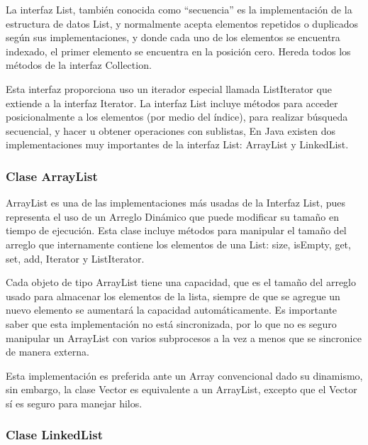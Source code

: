 \documentclass[11pt]{article}
\begin{document}
La interfaz List, también conocida como “secuencia” es la 
implementación de la estructura de datos List, y normalmente acepta 
elementos repetidos o duplicados según sus implementaciones, y donde 
cada uno de los elementos se encuentra indexado, el primer elemento 
se encuentra en la posición cero. Hereda todos los métodos de la 
interfaz Collection.

\par

Esta interfaz proporciona uso un iterador especial llamada 
ListIterator que extiende a la interfaz Iterator. La interfaz List 
incluye métodos para acceder posicionalmente a los elementos (por 
medio del índice), para realizar búsqueda secuencial, y hacer u 
obtener operaciones con sublistas, En Java existen dos 
implementaciones muy importantes de la interfaz List: ArrayList y 
LinkedList. 

\subsubsection{Clase ArrayList}
\par

ArrayList es una de las implementaciones más usadas de la Interfaz 
List, pues representa el uso de un Arreglo Dinámico que puede 
modificar su tamaño en tiempo de ejecución. Esta clase incluye 
métodos para manipular el tamaño del arreglo que internamente 
contiene los elementos de una List: size, isEmpty, get, set, add, 
Iterator y ListIterator.

\par

Cada objeto de tipo ArrayList tiene una capacidad, que es el tamaño 
del arreglo usado para almacenar los elementos de la lista, siempre 
de que se agregue un nuevo elemento se aumentará la capacidad 
automáticamente. Es importante saber que esta implementación no está 
sincronizada, por lo que no es seguro manipular un ArrayList con 
varios subprocesos a la vez a menos que se sincronice de manera 
externa. 
\par

Esta implementación es preferida ante un Array convencional dado su 
dinamismo, sin embargo, la clase Vector es equivalente a un 
ArrayList, excepto que el Vector sí es seguro para manejar hilos.

\subsubsection{Clase LinkedList}
\par
\end{document}

